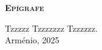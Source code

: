 
\vspace*{45pt}
\begin{flushleft}
	{\Large \textbf{\scshape{Ep\'{\i}grafe}}}
\end{flushleft}
\vspace*{10pt}

\begin{flushright}
	Tzzzzz Tzzzzzzz Tzzzzzz. \\
	Arménio, 2025
\end{flushright}

